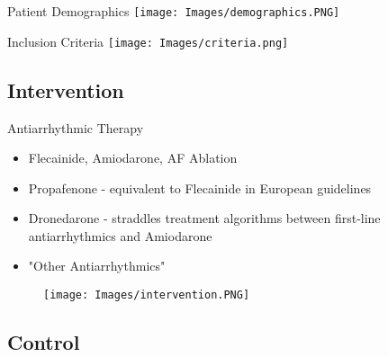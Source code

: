 \documentclass[UKenglish]{beamer}
\begin{document}
\begin{frame}{Patient Demographics}
    \texttt{[image: Images/demographics.PNG]}
\end{frame}

\begin{frame}{Inclusion Criteria}
    \texttt{[image: Images/criteria.png]}
\end{frame}

\subsection{Intervention}

\begin{frame}[allowframebreaks]{Antiarrhythmic Therapy}
    \begin{itemize}
        \item Flecainide, Amiodarone, AF Ablation
        \item Propafenone - equivalent to Flecainide in European guidelines 
        \item Dronedarone - straddles treatment algorithms between first-line antiarrhythmics and Amiodarone
        \item "Other Antiarrhythmics"
    \end{itemize}
    
    \begin{figure}
        \texttt{[image: Images/intervention.PNG]}
    \end{figure}
    
\end{frame}

\subsection{Control}
\end{document}
